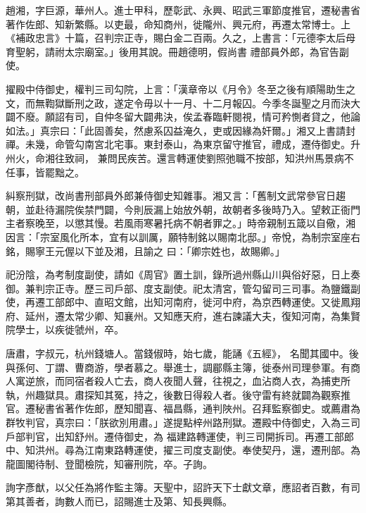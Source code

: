 \begin{pinyinscope}
 趙湘，字巨源，華州人。進士甲科，歷彰武、永興、昭武三軍節度推官，遷秘書省著作佐郎、知新繁縣。以吏最，命知商州，徙隴州、興元府，再遷太常博士。上《補政忠言》十篇，召判宗正寺，賜白金二百兩。久之，上書言：「元德李太后母育聖躬，請祔太宗廟室。」後用其說。冊趙德明，假尚書
 禮部員外郎，為官告副使。



 擢殿中侍御史，權判三司勾院，上言：「漢章帝以《月令》冬至之後有順陽助生之文，而無鞫獄斷刑之政，遂定令毋以十一月、十二月報囚。今季冬誕聖之月而決大闢不廢。願詔有司，自仲冬留大闢弗決，俟孟春臨軒閱視，情可矜惻者貸之，他論如法。」真宗曰：「此固善矣，然慮系囚益淹久，吏或因緣為奸爾。」湘又上書請封禪。未幾，命管勾南宮北宅事。東封泰山，為東京留守推官，禮成，遷侍御史。升州火，命湘往致祠，
 兼問民疾苦。還言轉運使劉照弛職不按部，知洪州馬景病不任事，皆罷黜之。



 糾察刑獄，改尚書刑部員外郎兼侍御史知雜事。湘又言：「舊制文武常參官日趨朝，並赴待漏院俟禁門闢，今則辰漏上始放外朝，故朝者多後時乃入。望敕正衙門主者察晚至，以懲其慢。若風雨寒暑托病不朝者罪之。」時帝親制五箴以自儆，湘因言：「宗室風化所本，宜有以訓厲，願特制銘以賜南北邸。」帝悅，為制宗室座右銘，賜寧王元偓以下並及湘，且諭之
 曰：「卿宗姓也，故賜卿。」



 祀汾陰，為考制度副使，請如《周官》置土訓，錄所過州縣山川與俗好惡，日上奏御。兼判宗正寺。歷三司戶部、度支副使。祀太清宮，管勾留司三司事。為鹽鐵副使，再遷工部郎中、直昭文館，出知河南府，徙河中府，為京西轉運使。又徙鳳翔府、延州，遷太常少卿、知襄州。又知應天府，進右諫議大夫，復知河南，為集賢院學士，以疾徙虢州，卒。



 唐肅，字叔元，杭州錢塘人。當錢俶時，始七歲，能誦《五經》，
 名聞其國中。後與孫何、丁謂、曹商游，學者慕之。舉進士，調郿縣主簿，徙泰州司理參軍。有商人寓逆旅，而同宿者殺人亡去，商人夜聞人聲，往視之，血沾商人衣，為捕吏所執，州趣獄具。肅探知其冤，持之，後數日得殺人者。後守雷有終就闢為觀察推官。遷秘書省著作佐郎，歷知聞喜、福昌縣，通判陜州。召拜監察御史。或薦肅為群牧判官，真宗曰：「朕欲別用肅。」遂提點梓州路刑獄。遷殿中侍御史，入為三司戶部判官，出知舒州。遷侍御史，為
 福建路轉運使，判三司開拆司。再遷工部郎中、知洪州。尋為江南東路轉運使，擢三司度支副使。奉使契丹，還，遷刑部。為龍圖閣待制、登聞檢院，知審刑院，卒。子詢。



 詢字彥猷，以父任為將作監主簿。天聖中，詔許天下士獻文章，應詔者百數，有司第其善者，詢數人而已，詔賜進士及第、知長興縣。




\end{pinyinscope}
